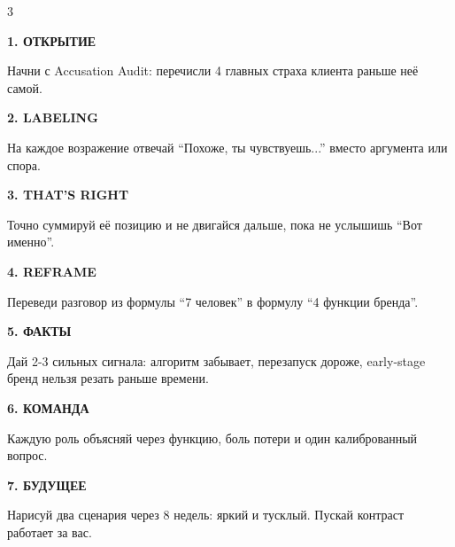 \documentclass[11pt,a4paper]{article}
\newcommand{\minititle}[1]{{\sansfont\bfseries\fontsize{9.5}{11}\selectfont\color{rose}\MakeUppercase{#1}}}
\begin{document}
\begin{multicols}{3}
\begin{softbox}[colback=paperwhite]
\minititle{1. Открытие}\par
Начни с Accusation Audit: перечисли 4 главных страха клиента раньше неё самой.
\end{softbox}

\vspace{2.5mm}
\begin{softbox}[colback=paperwhite]
\minititle{2. Labeling}\par
На каждое возражение отвечай ``Похоже, ты чувствуешь...'' вместо аргумента или спора.
\end{softbox}

\vspace{2.5mm}
\begin{softbox}[colback=paperwhite]
\minititle{3. That's Right}\par
Точно суммируй её позицию и не двигайся дальше, пока не услышишь ``Вот именно''.
\end{softbox}

\vspace{2.5mm}
\begin{softbox}[colback=paperwhite]
\minititle{4. Reframe}\par
Переведи разговор из формулы ``7 человек'' в формулу ``4 функции бренда''.
\end{softbox}

\vspace{2.5mm}
\begin{softbox}[colback=paperwhite]
\minititle{5. Факты}\par
Дай 2-3 сильных сигнала: алгоритм забывает, перезапуск дороже, early-stage бренд нельзя резать раньше времени.
\end{softbox}

\vspace{2.5mm}
\begin{softbox}[colback=paperwhite]
\minititle{6. Команда}\par
Каждую роль объясняй через функцию, боль потери и один калиброванный вопрос.
\end{softbox}

\vspace{2.5mm}
\begin{softbox}[colback=paperwhite]
\minititle{7. Будущее}\par
Нарисуй два сценария через 8 недель: яркий и тусклый. Пускай контраст работает за вас.
\end{softbox}


\end{multicols}
\end{document}
